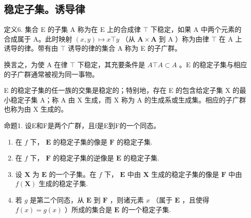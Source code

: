 \subsection{稳定子集。诱导律}

定义6. 集合 E 的子集 A 称为在 E 上的合成律 \(\top\) 下稳定，如果 A 中两个元素的合成属于 A。此时映射 \((x,y)\mapsto x\top y\) （从 \(\mathbf{A}\times \mathbf{A}\) 到 A ）称为由律 \(\top\) 在 A 上诱导的律。带有由 \(\top\) 诱导的律的集合 A 称为 E 的子广群。

换言之，为使 A 在律 \(\top\) 下稳定，其充要条件是 \(A \top A \subset A\) 。E 的稳定子集与相应的子广群通常被视为同一事物。

E 的稳定子集的任一族的交集是稳定的；特别地，存在 E 的包含给定子集 X 的最小稳定子集 A；称 A 由 X 生成，而 X 称为 A 的生成系或生成集。相应的子广群也称为由 X 生成的。

命题1. 设E和F是两个广群，且f是E到F的一个同态。

\begin{enumerate}
\def\labelenumi{(\roman{enumi})}
\item
  在 \(f\) 下， \(\mathbf{E}\) 的稳定子集的像是 \(\mathbf{F}\) 的稳定子集.
\item
  在 \(f\) 下， \(\mathbf{F}\) 的稳定子集的逆像是 \(\mathbf{E}\) 的稳定子集.
\item
  设 \(\mathbf{X}\) 为 \(\mathbf{E}\) 的一个子集。在 \(f\) 下， \(\mathbf{E}\) 中由 \(\mathbf{X}\) 生成的稳定子集的像是 \(\mathbf{F}\) 中由 \(f(\mathbf{X})\) 生成的稳定子集.
\item
  若 \(g\) 是第二个同态，从 \(\mathbf{E}\) 到 \(\mathbf{F}\) ，则诸元素 \(x\) （属于 \(\mathbf{E}\) ，且使得 \(f(x) = g(x)\) ）所成的集合是 \(\mathbf{E}\) 的一个稳定子集.
\end{enumerate}

